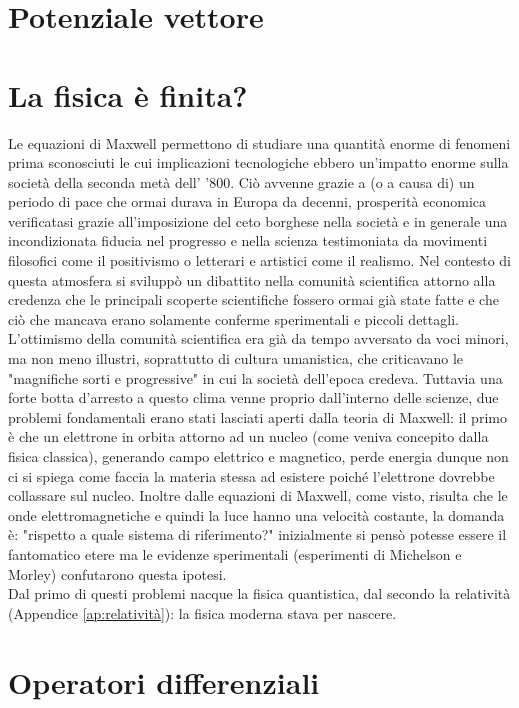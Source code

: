 \documentclass[
10pt, %
a4paper, %
oneside, %
headinclude,footinclude, %
BCOR5mm, %
]{scrartcl}
\begin{document}
\section{Potenziale vettore}
\section{La fisica è finita?}
Le equazioni di Maxwell permettono di studiare una quantità enorme di fenomeni prima sconosciuti le cui implicazioni tecnologiche ebbero un'impatto enorme sulla società della seconda metà dell' '800. Ciò avvenne grazie a (o a causa di) un periodo di pace che ormai durava in Europa da decenni, prosperità economica verificatasi grazie all'imposizione del ceto borghese nella società e in generale una incondizionata fiducia nel progresso e nella scienza testimoniata da movimenti filosofici come il positivismo o letterari e artistici come il realismo. Nel contesto di questa atmosfera si sviluppò un dibattito nella comunità scientifica attorno alla credenza che le principali scoperte scientifiche fossero ormai già state fatte e che ciò che mancava erano solamente conferme sperimentali e piccoli dettagli. L'ottimismo della comunità scientifica era già da tempo avversato da voci minori, ma non meno illustri, soprattutto di cultura umanistica, che criticavano le "magnifiche sorti e progressive" in cui la società dell'epoca credeva. Tuttavia una forte botta d'arresto a questo clima venne proprio dall'interno delle scienze, due problemi fondamentali erano stati lasciati aperti dalla teoria di Maxwell: il primo è che un elettrone in orbita attorno ad un nucleo (come veniva concepito dalla fisica classica), generando campo elettrico e magnetico, perde energia dunque non ci si spiega come faccia la materia stessa ad esistere poiché l'elettrone dovrebbe collassare sul nucleo. Inoltre dalle equazioni di Maxwell, come visto, risulta che le onde elettromagnetiche e quindi la luce hanno una velocità costante, la domanda è: "rispetto a quale sistema di riferimento?" inizialmente si pensò potesse essere il fantomatico etere ma le evidenze sperimentali (esperimenti di Michelson e Morley) confutarono questa ipotesi.\\
Dal primo di questi problemi nacque la fisica quantistica, dal secondo la relatività (Appendice \ref{ap:relatività}): la fisica moderna stava per nascere. 
\appendix
\section{Operatori differenziali}\label{ap:operatori_differenziali}
\end{document}
